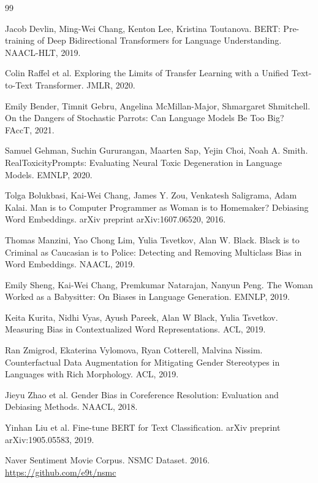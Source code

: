 \documentclass{article}
\begin{document}

\begin{thebibliography}{99}


Jacob Devlin, Ming-Wei Chang, Kenton Lee, Kristina Toutanova. BERT: Pre-training of Deep Bidirectional Transformers for Language Understanding. NAACL-HLT, 2019.

Colin Raffel et al. Exploring the Limits of Transfer Learning with a Unified Text-to-Text Transformer. JMLR, 2020.

Emily Bender, Timnit Gebru, Angelina McMillan-Major, Shmargaret Shmitchell. On the Dangers of Stochastic Parrots: Can Language Models Be Too Big? FAccT, 2021.

Samuel Gehman, Suchin Gururangan, Maarten Sap, Yejin Choi, Noah A. Smith. RealToxicityPrompts: Evaluating Neural Toxic Degeneration in Language Models. EMNLP, 2020.

Tolga Bolukbasi, Kai-Wei Chang, James Y. Zou, Venkatesh Saligrama, Adam Kalai. Man is to Computer Programmer as Woman is to Homemaker? Debiasing Word Embeddings. arXiv preprint arXiv:1607.06520, 2016.

Thomas Manzini, Yao Chong Lim, Yulia Tsvetkov, Alan W. Black. Black is to Criminal as Caucasian is to Police: Detecting and Removing Multiclass Bias in Word Embeddings. NAACL, 2019.

Emily Sheng, Kai-Wei Chang, Premkumar Natarajan, Nanyun Peng. The Woman Worked as a Babysitter: On Biases in Language Generation. EMNLP, 2019.

Keita Kurita, Nidhi Vyas, Ayush Pareek, Alan W Black, Yulia Tsvetkov. Measuring Bias in Contextualized Word Representations. ACL, 2019.

Ran Zmigrod, Ekaterina Vylomova, Ryan Cotterell, Malvina Nissim. Counterfactual Data Augmentation for Mitigating Gender Stereotypes in Languages with Rich Morphology. ACL, 2019.

Jieyu Zhao et al. Gender Bias in Coreference Resolution: Evaluation and Debiasing Methods. NAACL, 2018.

Yinhan Liu et al. Fine-tune BERT for Text Classification. arXiv preprint arXiv:1905.05583, 2019.

Naver Sentiment Movie Corpus. NSMC Dataset. 2016. \url{https://github.com/e9t/nsmc}


\end{thebibliography}
\end{document}
